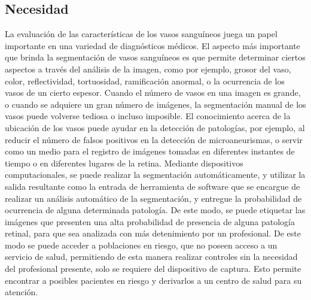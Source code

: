 \subsection{Necesidad}
La evaluaci\'on de las caracter\'isticas de los vasos sangu\'ineos  juega un papel importante en una variedad de diagn\'osticos m\'edicos. El aspecto m\'as importante que brinda la segmentaci\'on de vasos sangu\'ineos es que permite determinar ciertos aspectos a trav\'es del an\'alisis de la imagen, como por ejemplo, grosor del vaso, color, reflectividad, tortuosidad, ramificaci\'on anormal, o la ocurrencia de los vasos de un cierto espesor. Cuando el n\'umero de vasos en una imagen es grande, o cuando se adquiere un gran n\'umero de im\'agenes, la segmentaci\'on manual de los vasos puede volverse tediosa o incluso imposible. El conocimiento acerca de la ubicaci\'on de los vasos puede ayudar en la detecci\'on de patolog\'ias, por ejemplo, al reducir el n\'umero de falsos positivos en la detecci\'on de microaneurismas, o servir como un medio para el registro de im\'agenes tomadas en diferentes instantes de tiempo o en diferentes lugares de la retina. \cite{staal2004ridge}
Mediante dispositivos computacionales, se puede realizar la segmentación autom\'aticamente, y utilizar la salida resultante como la entrada de herramienta de software que se encargue de  realizar un an\'alisis autom\'atico de la segmentaci\'on, y entregue la probabilidad de ocurrencia de alguna determinada patolog\'ia. De este modo, se puede etiquetar las im\'agenes que presenten una alta  probabilidad de presencia de alguna patolog\'ia retinal, para que sea analizada con m\'as detenimiento por un profesional. De este modo se puede acceder a poblaciones en riesgo, que no poseen acceso a un servicio de salud, permitiendo de esta manera realizar controles sin la necesidad del profesional presente, solo se requiere del dispositivo de captura. Esto permite encontrar a posibles pacientes en riesgo y derivarlos a un centro de salud para su atenci\'on.


